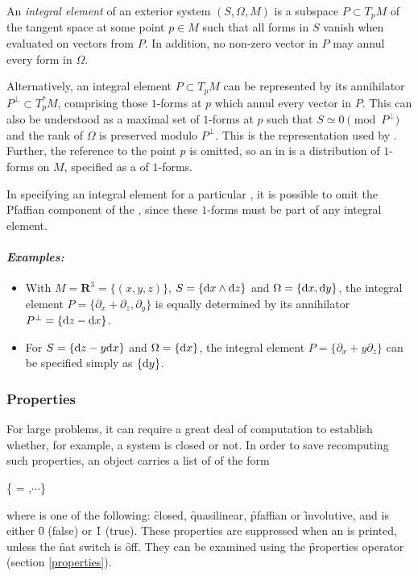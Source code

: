 An \emph{integral element} of an exterior system $(S,\Omega,M)$ is a
subspace $P\subset T_pM$ of the tangent space at some point $p\in M$
such that all forms in $S$ vanish when evaluated on vectors from $P$. In
addition, no non-zero vector in $P$ may annul every form in $\Omega$.

Alternatively, an integral element $P\subset T_pM$ can be represented
by its annihilator $P^\perp\subset T^*_pM$, comprising those $1$-forms
at $p$ which annul every vector in $P$. This can also be understood as a
maximal set of $1$-forms at $p$ such that $S \simeq 0 \pmod{P^\perp}$ and
the rank of $\Omega$ is preserved modulo $P^\perp$.  This is the
representation used by . Further, the reference to the point $p$ is
omitted, so an  in  is a distribution of
$1$-forms on $M$, specified as a  of $1$-forms.

In specifying an integral element for a particular , it is
possible to omit the Pfaffian component of the , since these
$1$-forms must be part of any integral element.

\paragraph{\textit{Examples:}}
\begin{itemize}
\item With $M = {\mathbf{R}}^3 = \{(x,y,z)\}$, $S = \{\mathrm{d} x\wedge \mathrm{d} z\}$ and
      $\Omega = \{\mathrm{d} x,\mathrm{d} y\}$, the integral element $P =
       \{\partial_x + \partial_z,\partial_y\}$ is equally determined by its
      annihilator $P^\perp = \{\mathrm{d} z - \mathrm{d} x\}$.
\item For $S = \{\mathrm{d} z - y\mathrm{d} x\}$ and $\Omega = \{\mathrm{d} x\}$, the integral
      element $P = \{\partial_x + y\partial_z\}$ can be specified
      simply as $\{\mathrm{d} y\}$.
\end{itemize}

\subsubsection{Properties}
\label{Properties}

For large problems, it can require a great deal of computation to establish
whether, for example, a system is closed or not. In order to save
recomputing such properties, an  object carries a list of
 of the form
\begin{syntax}
	\{ = ,$\cdots$\}
\end{syntax}
where  is one of the following: \f{closed}, \f{quasilinear}, \f{pfaffian} or
\f{involutive}, and  is either \f{0} (false) or \f{1}
(true). These properties are suppressed when an  is printed,
unless the \f{nat} switch is \f{off}. They can be examined using the
\f{properties} operator (section \ref{properties}).

